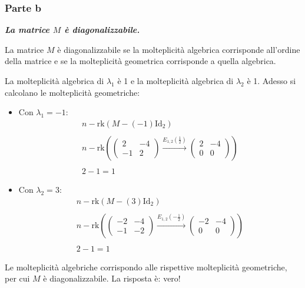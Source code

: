 \documentclass[a4paper]{article}
\begin{document}
	\subsubsection{Parte b}

	\textcolor{Green4}{\textbf{\emph{La matrice $M$ è diagonalizzabile.}}}\newline

	\noindent
	La matrice $M$ è diagonalizzabile se la molteplicità algebrica corrisponde all'ordine della matrice e se la molteplicità geometrica corrisponde a quella algebrica.\newline

	\noindent
	La molteplicità algebrica di $\lambda_{1}$ è 1 e la molteplicità algebrica di $\lambda_{2}$ è 1. Adesso si calcolano le molteplicità geometriche:
	\begin{itemize}
		\item Con $\lambda_{1} = -1$:
		\begin{gather*}
			n - \mathrm{rk}\left(M - \left(-1\right)\mathrm{Id}_{2}\right) \\
			\\
			n - \mathrm{rk}\left(\begin{pmatrix}
				2 & -4 \\
				-1 & 2
			\end{pmatrix} \xrightarrow{E_{1,2}\left(\frac{1}{2}\right)}
			\begin{pmatrix}
				2 & -4 \\
				0 & 0
			\end{pmatrix}\right) \\
			\\
			2 - 1 = 1
		\end{gather*}

		\item  Con $\lambda_{2} = 3$:
		\begin{gather*}
			n - \mathrm{rk}\left(M - \left(3\right)\mathrm{Id}_{2}\right) \\
			\\
			n - \mathrm{rk}\left(\begin{pmatrix}
				-2 & -4 \\
				-1 & -2
			\end{pmatrix} \xrightarrow{E_{1,2}\left(-\frac{1}{2}\right)}
			\begin{pmatrix}
				-2 & -4 \\
				0 & 0
			\end{pmatrix}\right) \\
			\\
			2 - 1 = 1
		\end{gather*}
	\end{itemize}
	Le molteplicità algebriche corrispondo alle rispettive molteplicità geometriche, per cui $M$ è diagonalizzabile. La risposta è: vero!\newline
\end{document}

